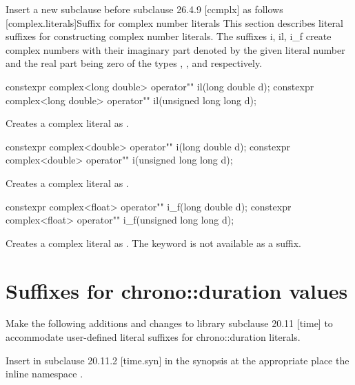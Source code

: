 \documentclass[ebook,11pt,article]{memoir}
\begin{document}
Insert a new subclause before subclause 26.4.9 [ccmplx] as follows
[complex.literals]{Suffix for complex number literals}
\pnum
This section describes literal suffixes for constructing complex number literals. The suffixes i, il, i_f create complex numbers with their imaginary part denoted by the given literal number and the real part being zero of the types , , and  respectively. 

\begin{itemdecl}
constexpr complex<long double> operator"" il(long double d);
constexpr complex<long double> operator"" il(unsigned long long d);
\end{itemdecl}

\begin{itemdescr}
\pnum
\effects
Creates a complex literal as .
\end{itemdescr}

\begin{itemdecl}
constexpr complex<double> operator"" i(long double d);
constexpr complex<double> operator"" i(unsigned long long d);
\end{itemdecl}

\begin{itemdescr}
\pnum
\effects
Creates a complex literal as .
\end{itemdescr}

\begin{itemdecl}
constexpr complex<float> operator"" i_f(long double d);
constexpr complex<float> operator"" i_f(unsigned long long d);
\end{itemdecl}

\begin{itemdescr}
\pnum
\effects
Creates a complex literal as .
\enternote
The keyword  is not available as a suffix.
\exitnote
\end{itemdescr}


\section{Suffixes for chrono::duration values}
Make the following additions and changes to library subclause 20.11 [time] to accommodate user-defined literal suffixes for chrono::duration literals.

Insert in subclause 20.11.2 [time.syn] in the synopsis at the appropriate place the inline namespace .
\renewcommand{\unspec}{\UNSP{unspecified}}%
\end{document}
